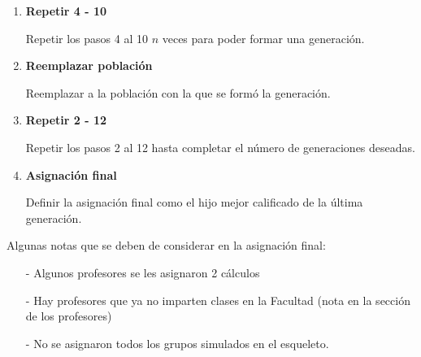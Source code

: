 \begin{enumerate}
\item \textbf{Repetir 4 - 10}

Repetir los pasos 4 al 10 $n$ veces para poder formar una generación.

\item \textbf{Reemplazar población}

Reemplazar a la población con la que se formó la generación.

\item \textbf{Repetir 2 - 12}

Repetir los pasos 2 al 12 hasta completar el número de generaciones deseadas.

\item \textbf{Asignación final}

Definir la asignación final como el hijo mejor calificado de la última generación.
\end{enumerate}


Algunas notas que se deben de considerar en la asignación final:

\begin{itemize}
\item[-] Algunos profesores se les asignaron 2 cálculos

\item[-] Hay profesores que ya no imparten clases en la Facultad (nota en la sección de los profesores)

\item[-] No se asignaron todos los grupos simulados en el esqueleto.
\end{itemize}


